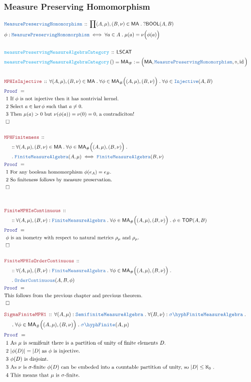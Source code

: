 \documentclass[12pt]{scrartcl}
\newcommand{\TYPE}[1]{\textcolor{NavyBlue}{\mathtt{#1}}}
\newcommand{\FUNC}[1]{\textcolor{Cerulean}{\mathtt{#1}}}
\newcommand{\LOGIC}[1]{\textcolor{Blue}{\mathtt{#1}}}
\newcommand{\THM}[1]{\textcolor{Maroon}{\mathtt{#1}}}
\renewcommand{\.}{\; . \;}
\newcommand{\de}{: \kern 0.1pc =}
\newcommand{\Act}[1]{\left( #1 \right)}
\newcommand{\Theorem}[2]{& \THM{#1} \, :: \, #2 \\ & \Proof = \\ }
\newcommand{\DeclareType}[2]{& \TYPE{#1} \, :: \, #2 \\}
\newcommand{\DefineType}[3]{& #1 : \TYPE{#2} \iff #3 \\}
\newcommand{\DeclareFunc}[2]{& \FUNC{#1} \, :: \, #2 \\}
\newcommand{\DefineNamedFunc}[4]{&  \FUNC{#1}\Act{#2} = #3 \de #4 \\}
\newcommand{\NewLine}{\\ & \kern 1pc}
\newcommand{\Page}[1]{ \begin{align*} #1 \end{align*}   }
\DeclareMathOperator*{\id}{id}
\newcommand{\QED}{\; \square}
\newcommand{\EndProof}{& \QED \\}
\newcommand{\Proof}{\LOGIC{Proof} \; }
\newcommand{\Explain}[1]{& \text{#1.} \\}
\newcommand{\Exclaim}[1]{& \text{#1!} \\}
\newcommand{\Finite}{\TYPE{Finite}}
\newcommand{\Inj}{\TYPE{Injective}}
\newcommand{\oC}{\TYPE{OrderContinuous}}
\newcommand{\BOOL}{\mathsf{BOOL}}
\newcommand{\TOP}{\mathsf{TOP}}
\newcommand{\sFinite}{\TYPE{\sigma \hyph  Finite}}
\newcommand{\Semifinite}{\TYPE{Semifinite}}
\newcommand{\MA}{\TYPE{MeasureAlgebra}}
\newcommand{\MPH}{\TYPE{MeasurePreservingHomomorphism}}
\newcommand{\ma}{\mathsf{MA}}
\begin{document}
\subsubsection{Measure Preserving Homomorphism}
\Page{
	\DeclareType{\MPH}{\prod (A,\mu),(B,\nu) \in \ma \. ?\BOOL(A,B)}
	\DefineType{\phi}{\MPH}{\forall a \in A \. \mu(a) = \nu\Big( \phi(a) \Big)}
	\\
	\DeclareFunc{measurePreservingMeasureAlgebraCategory}{\mathsf{LSCAT}}
	\DefineNamedFunc{measurePreservingMeasureAlgebraCategory}{}{\ma_\#}
	{\Big( \ma, \MPH, \circ, \id\Big)}
	\\
	\Theorem{MPHIsInjective}
	{
		\forall (A,\mu),(B,\nu) \in \ma \.
		\forall \phi \in \ma_\#\Big( (A,\mu), (B,\nu) \Big) \.
		\forall \phi \in \Inj(A,B)
	}
	\Explain{ 1 If $\phi$ is not injective then it has nontrivial kernel}
	\Explain{ 2 Select $a \in \ker \phi$ such that $a \neq 0$}
	\Exclaim{ 3 Then $\mu(a) > 0$ but $\nu(\phi(a)) = \nu(0) = 0$, a contradiciton}
	\EndProof
	\\
	\Theorem{MPHFiniteness}
	{
		\NewLine ::		
		\forall (A,\mu),(B,\nu) \in \ma \.
		\forall \phi \in \ma_\#\Big( (A,\mu), (B,\nu) \Big) \. \NewLine \.
		\Finite\MA(A,\mu) \iff \Finite\MA(B,\nu)
	}
	\Explain{ 1 For any boolean homomorphism $\phi(e_A) = e_B$}
	\Explain{ 2 So finiteness follows by measure preservation}
	\EndProof
	\\  
	\\
	\Theorem{FiniteMPHIsContinuous}
	{
		\NewLine ::		
		\forall (A,\mu),(B,\nu) : \Finite\MA \.
		\forall \phi \in \ma_\#\Big( (A,\mu), (B,\nu) \Big) \. \phi \in \TOP(A,B)
	}
	\Explain{ $\phi$ is an isometry with respect to natural metrics $\rho_\mu$ and $\rho_\mu$}
	\EndProof
	\\
	\Theorem{FiniteMPHIsOrderContinuous}
	{
		\NewLine ::		
		\forall (A,\mu),(B,\nu) : \Finite\MA \.
		\forall \phi \in \ma_\#\Big( (A,\mu), (B,\nu) \Big) \. \NewLine \.
		\oC(A,B,\phi)
	}
	\Explain{This follows from the previous chapter and previous theorem}
	\EndProof
}\Page{
	\Theorem{SigmaFiniteMPH1}
	{
		\forall (A,\mu) : \Semifinite\MA \.
		\forall (B,\nu) : \sFinite\MA \. \NewLine \.
		\forall \phi \in \ma_\#\Big( (A,\mu), (B,\nu) \Big) \. 
		\sFinite(A,\mu)
	}
	\Explain{ 1 As $\mu$ is semifenit there is a partition of unity of finite elements $D$}
	\Explain{ 2 $|\phi(D)| = |D|$ as $\phi$ is injective}
	\Explain{ 3 $\phi(D)$ is disjoint}
	\Explain{ 3 As $\nu$ is $\sigma$-finite $\phi(D)$ can be embeded into 
		a countable partition of unity, so $|D| \le \aleph_0$ }
	\Explain{ 4 This means that $\mu$ is $\sigma$-finite}
}
\end{document}
